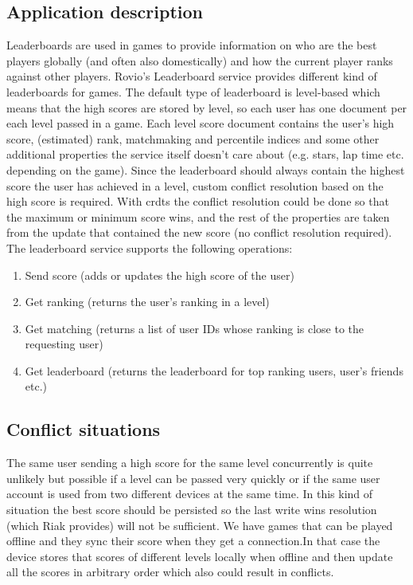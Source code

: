 \documentclass[11pt,a4paper]{report}
\begin{document}
\subsection{Application description}
Leaderboards are used in games to provide information on who are the best players globally (and often also domestically) and how the current player ranks against other players.
Rovio's Leaderboard service provides different kind of leaderboards for games. The default type of leaderboard is level­-based which means that the high scores are stored by level, so each user has one document per each level passed in a game. Each level score document contains the user's high score, (estimated) rank, matchmaking and percentile indices and some other additional properties the service itself doesn't care about (e.g. stars, lap time etc. depending on the game).
Since the leaderboard should always contain the highest score the user has achieved in a level, custom conflict resolution based on the high score is required. With \glspl{crdt} the conflict resolution could be done so that the maximum or minimum score wins, and the rest of the properties are taken from the update that contained the new score (no conflict resolution required).
The leaderboard service supports the following operations:
\begin{enumerate}
\item Send score (adds or updates the high score of the user)
\item Get ranking (returns the user's ranking in a level)
\item Get matching (returns a list of user IDs whose ranking is close to the requesting user)
\item Get leaderboard (returns the leaderboard for top ranking users, user's friends etc.)
\end{enumerate}

\subsection{Conflict situations}
The same user sending a high score for the same level concurrently is quite unlikely but possible if a level can be passed very quickly or if the same user account is used from two different devices at the same time. In this kind of situation the best score should be persisted so the last write wins resolution (which Riak provides) will not be sufficient.
We have games that can be played offline and they sync their score when they get a connection.In that case the device stores that scores of different levels locally when offline and then update all the scores in arbitrary order which also could result in conflicts.
\end{document}

